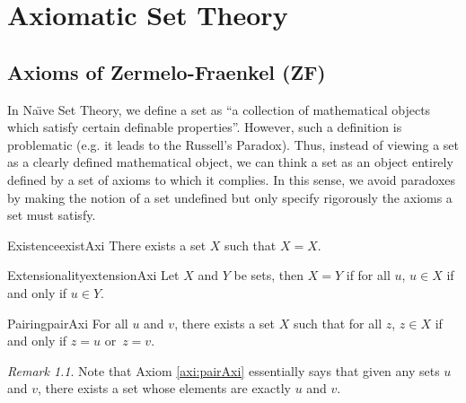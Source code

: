 \documentclass[math]{amznotes}
\theoremstyle{remark}
\newtheorem*{remark}{Remark}
\begin{document}
\chapter{Axiomatic Set Theory}
\section{Axioms of Zermelo-Fraenkel (ZF)}
In Na\"\i ve Set Theory, we define a set as ``a collection of mathematical objects which satisfy certain definable properties''. However, such a definition is problematic (e.g. it leads to the Russell's Paradox). Thus, instead of viewing a set as a clearly defined mathematical object, we can think a set as an object entirely defined by a set of axioms to which it complies. In this sense, we avoid paradoxes by making the notion of a set undefined but only specify rigorously the axioms a set must satisfy.
\begin{axibox}{Existence}{existAxi}
    There exists a set $X$ such that $X = X$.
\end{axibox}
\begin{axibox}{Extensionality}{extensionAxi}
    Let $X$ and $Y$ be sets, then $X = Y$ if for all $u$, $u \in X$ if and only if $u \in Y$.
\end{axibox}
\begin{axibox}{Pairing}{pairAxi}
    For all $u$ and $v$, there exists a set $X$ such that for all $z$, $z \in X$ if and only if $z = u$ or~$z = v$.
\end{axibox}
\begin{notebox}
    \begin{remark}
        Note that Axiom \ref{axi:pairAxi} essentially says that given any sets $u$ and $v$, there exists a set whose elements are exactly $u$ and $v$.
    \end{remark}
\end{notebox}
\end{document}

